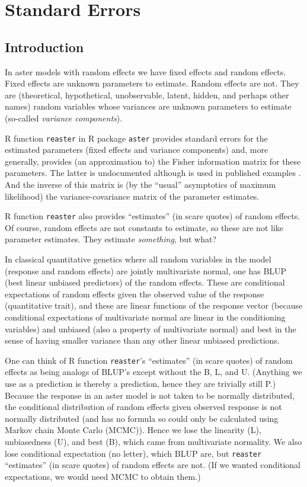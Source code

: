 \documentclass[11pt]{article}
\let\code=\texttt
\begin{document}
\section{Standard Errors}

\subsection{Introduction}

In aster models with random effects \citep*{reaster} we have fixed effects
and random effects.  Fixed effects are unknown parameters to estimate.
Random effects are not.  They are (theoretical, hypothetical, unobservable,
latent, hidden, and perhaps other names) random variables whose variances are
unknown parameters to estimate (so-called \emph{variance components}).

R function \code{reaster} in R package \code{aster} \citep{aster-package}
provides standard errors for the estimated parameters (fixed effects and
variance components) and, more generally, provides (an approximation to)
the Fisher information matrix for these parameters.  The latter is
undocumented although is used in published examples
\citep[Supplementary material Section~12.3.1]{zenodo}.  And the inverse
of this matrix is (by the ``usual'' asymptotics of maximum likelihood)
the variance-covariance matrix of the parameter estimates.

R function \code{reaster} also provides ``estimates'' (in scare quotes)
of random effects.  Of course, random effects are not constants to estimate,
so these are not like parameter estimates.  They estimate \emph{something}, but
what?

In classical quantitative genetics where all random variables in the model
(response and random effects) are jointly multivariate normal, one has
BLUP (best linear unbiased predictors) of the random effects.  These
are conditional expectations of random effects given the observed value
of the response (quantitative trait), and these are linear functions
of the response vector (because conditional expectations of multivariate
normal are linear in the conditioning variables) and unbiased
(also a property of multivariate normal)
and best in the sense of having smaller variance than any other linear
unbiased predictions.

One can think of R function \code{reaster}'s ``estimates'' (in scare quotes)
of random effects as being analogs of BLUP's except without the B, L, and U.
(Anything we use as a prediction is thereby a prediction, hence they are
trivially still P.)
Because the response in an aster model is not taken to be normally distributed,
the conditional distribution of random effects given observed response is
not normally distributed (and has no formula so could only be calculated
using Markov chain Monte Carlo (MCMC)).  Hence we lose the linearity (L),
unbiasedness (U), and best (B), which came from multivariate normality.
We also lose conditional expectation (no letter), which BLUP are,
but \code{reaster} ``estimates'' (in scare quotes) of random effects are not.
(If we wanted conditional expectations, we would need MCMC to obtain them.)
\end{document}
